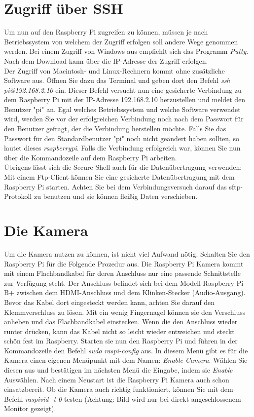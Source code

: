 \documentclass[12pt,a4paper]{scrreprt}
\begin{document}
\section{Zugriff über SSH}
Um nun auf den Raspberry Pi zugreifen zu können, müssen je nach Betriebssystem von welchem der Zugriff erfolgen soll andere Wege genommen werden. Bei einem Zugriff von Windows aus empfiehlt sich das Programm \textit{Putty}. Nach dem Download kann über die IP-Adresse der Zugriff erfolgen. \\Der Zugriff von Macintosh- und Linux-Rechnern kommt ohne zusätzliche Software aus. Öffnen Sie dazu das Terminal und geben dort den Befehl \textit{ssh pi@192.168.2.10} ein. Dieser Befehl versucht nun eine gesicherte Verbindung zu dem Raspberry Pi mit der IP-Adresse 192.168.2.10 herzustellen und meldet den Benutzer "pi" an. Egal welches Betriebssystem und welche Software verwendet wird, werden Sie vor der erfolgreichen Verbindung noch nach dem Passwort für den Benutzer gefragt, der die Verbindung herstellen möchte. Falls Sie das Passwort für den Standardbenutzer "pi" noch nicht geändert haben sollten, so lautet dieses \textit{raspberrypi}. Falls die Verbindung erfolgreich war, können Sie nun über die Kommandozeile auf dem Raspberry Pi arbeiten. \\ Übrigens lässt sich die Secure Shell auch für die Datenübertragung verwenden: Mit einem Ftp-Client können Sie eine gesicherte Datenübertragung mit dem Raspberry Pi starten. Achten Sie bei dem Verbindungsversuch darauf das sftp-Protokoll zu benutzen und sie können fleißig Daten verschieben.

\section{Die Kamera}
Um die Kamera nutzen zu können, ist nicht viel Aufwand nötig. Schalten Sie den Raspberry Pi für die Folgende Prozedur aus. Die Raspberry Pi Kamera kommt mit einem Flachbandkabel für deren Anschluss nur eine passende Schnittstelle zur Verfügung steht. Der Anschluss befindet sich bei dem Modell Raspberry Pi B+ zwischen dem HDMI-Anschluss und dem Klinken-Stecker (Audio-Ausgang). Bevor das Kabel dort eingesteckt werden kann, achten Sie darauf den Klemmverschluss zu lösen. Mit ein wenig Fingernagel können sie den Verschluss anheben und das Flachbandkabel einstecken. Wenn die den Anschluss wieder runter drücken, kann das Kabel nicht so leicht wieder entweichen und steckt schön fest im Raspberry. Starten sie nun den Raspberry Pi und führen in der Kommandozeile den Befehl \textit{sudo raspi-config} aus. In diesem Menü gibt es für die Kamera einen eigenen Menüpunkt mit dem Namen: \textit{Enable Camera}. Wählen Sie diesen aus und bestätigen im nächsten Menü die Eingabe, indem sie \textit{Enable} Auswählen. Nach einem Neustart ist die Raspberry Pi Kamera auch schon einsatzbereit. Ob die Kamera auch richtig funktioniert, können Sie mit dem Befehl \textit{raspivid -t 0} testen (Achtung: Bild wird nur bei direkt angeschlossenem Monitor gezeigt). 
\end{document}
